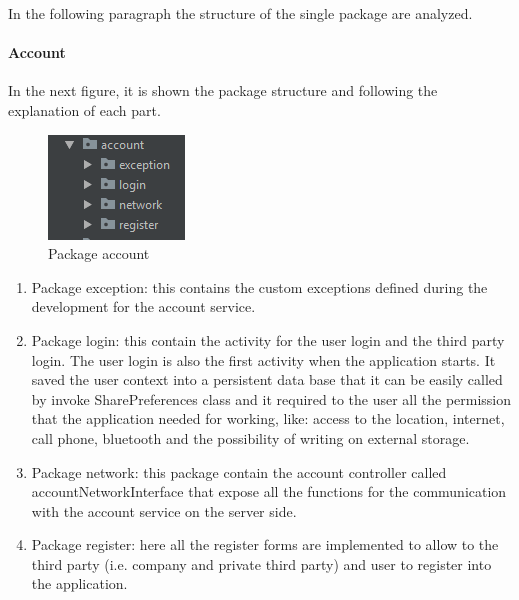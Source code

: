 In the following paragraph the structure of the single package are analyzed.

\paragraph{Account}
In the next figure, it is shown the package structure and following the explanation of each part.
  
\begin{figure}[H]
\includegraphics[width=\linewidth]{images/PackageAccount.png}
\caption{ Package account}
\label{fig:pkgsharedata}
\end{figure}

\begin{enumerate}
\item Package exception: this contains the custom exceptions defined during the development for the account service.
\item Package login: this contain the activity for the user login and the third party login. The user login is also the first activity when the application starts. It saved the user context into a persistent data base that it can be easily called by invoke SharePreferences class and it required to the user all the permission that the application needed for working, like: access to the location, internet, call phone, bluetooth and the possibility of writing on external storage.
\item Package network: this package contain the account controller called accountNetworkInterface that expose all the functions for the communication with the account service on the server side.
\item Package register: here all the register forms are implemented to allow to the third party (i.e. company and private third party) and user to register into the application. 
\end{enumerate}


